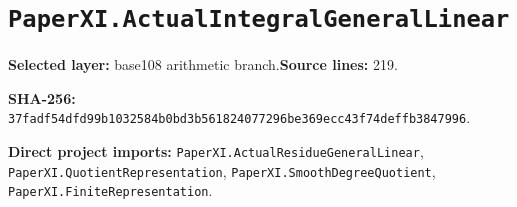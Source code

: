 \documentclass[10pt,oneside]{book}
\begin{document}
\section{\texorpdfstring{\nolinkurl{PaperXI.ActualIntegralGeneralLinear}}{PaperXI.ActualIntegralGeneralLinear}}\label{module:PaperXI.ActualIntegralGeneralLinear}

\textbf{Selected layer:} base108 arithmetic branch.\quad\textbf{Source lines:} 219.\par\textbf{SHA-256:} {\scriptsize\nolinkurl{37fadf54dfd99b1032584b0bd3b561824077296be369ecc43f74deffb3847996}}.


\textbf{Direct project imports:} \nolinkurl{PaperXI.ActualResidueGeneralLinear}, \nolinkurl{PaperXI.QuotientRepresentation}, \nolinkurl{PaperXI.SmoothDegreeQuotient}, \nolinkurl{PaperXI.FiniteRepresentation}.
\end{document}
